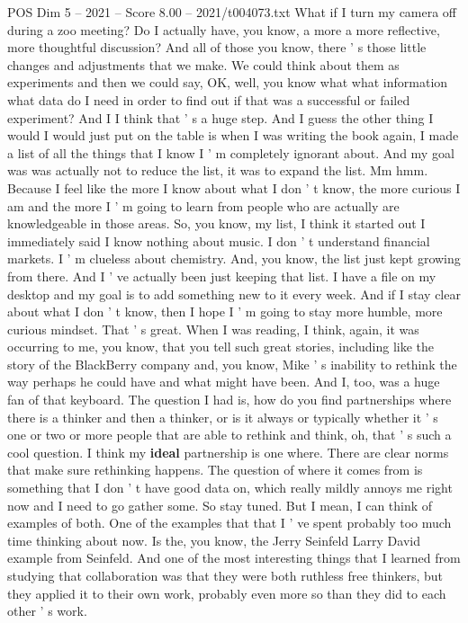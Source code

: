 \begin{textsample}{POS Dim 5 – 2021 – Score 8.00 – 2021/t004073.txt}
What if I turn my camera off during a zoo meeting?
Do I actually have, you know, a more a more reflective, more thoughtful discussion?
And all of those you know, there ' s those little changes and adjustments that we make.
We could think about them as experiments and then we could say, OK, well, you know what what information what data do I need in order to find out if that was a successful or failed experiment?
And I I think that ' s a huge step.
And I guess the other thing I would I would just put on the table is when I was writing the book again, I made a list of all the things that I know I ' m completely ignorant about.
And my goal was was actually not to reduce the list, it was to expand the list.
Mm hmm.
Because I feel like the more I know about what I don ' t know, the more curious I am and the more I ' m going to learn from people who are actually are knowledgeable in those areas.
So, you know, my list, I think it started out I immediately said I know nothing about music.
I don ' t understand financial markets.
I ' m clueless about chemistry.
And, you know, the list just kept growing from there.
And I ' ve actually been just keeping that list.
I have a file on my desktop and my goal is to add something new to it every week.
And if I stay clear about what I don ' t know, then I hope I ' m going to stay more humble, more curious mindset.
That ' s great.
When I was reading, I think, again, it was occurring to me, you know, that you tell such great stories, including like the story of the BlackBerry company and, you know, Mike ' s inability to rethink the way perhaps he could have and what might have been.
And I, too, was a huge fan of that keyboard.
The question I had is, how do you find partnerships where there is a thinker and then a thinker, or is it always or typically whether it ' s one or two or more people that are able to rethink and think, oh, that ' s such a cool question.
I think my \textbf{ideal} partnership is one where.
There are clear norms that make sure rethinking happens.
The question of where it comes from is something that I don ' t have good data on, which really mildly annoys me right now and I need to go gather some.
So stay tuned.
But I mean, I can think of examples of both.
One of the examples that that I ' ve spent probably too much time thinking about now.
Is the, you know, the Jerry Seinfeld Larry David example from Seinfeld.
And one of the most interesting things that I learned from studying that collaboration was that they were both ruthless free thinkers, but they applied it to their own work, probably even more so than they did to each other ' s work.

\end{textsample}
